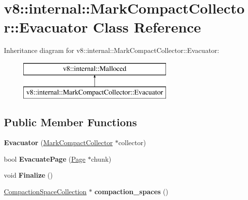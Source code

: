 \hypertarget{classv8_1_1internal_1_1_mark_compact_collector_1_1_evacuator}{}\section{v8\+:\+:internal\+:\+:Mark\+Compact\+Collector\+:\+:Evacuator Class Reference}
\label{classv8_1_1internal_1_1_mark_compact_collector_1_1_evacuator}
Inheritance diagram for v8\+:\+:internal\+:\+:Mark\+Compact\+Collector\+:\+:Evacuator\+:\begin{figure}[H]
\begin{center}
\leavevmode
\includegraphics[height=2.000000cm]{classv8_1_1internal_1_1_mark_compact_collector_1_1_evacuator}
\end{center}
\end{figure}
\subsection*{Public Member Functions}
\begin{DoxyCompactItemize}
\item 
{\bfseries Evacuator} (\hyperlink{classv8_1_1internal_1_1_mark_compact_collector}{Mark\+Compact\+Collector} $\ast$collector)\hypertarget{classv8_1_1internal_1_1_mark_compact_collector_1_1_evacuator_aa10dd913c673cfb9dc81e7feee451b35}{}\label{classv8_1_1internal_1_1_mark_compact_collector_1_1_evacuator_aa10dd913c673cfb9dc81e7feee451b35}

\item 
bool {\bfseries Evacuate\+Page} (\hyperlink{classv8_1_1internal_1_1_page}{Page} $\ast$chunk)\hypertarget{classv8_1_1internal_1_1_mark_compact_collector_1_1_evacuator_ad4230377f82124adf759e66c8faa88e7}{}\label{classv8_1_1internal_1_1_mark_compact_collector_1_1_evacuator_ad4230377f82124adf759e66c8faa88e7}

\item 
void {\bfseries Finalize} ()\hypertarget{classv8_1_1internal_1_1_mark_compact_collector_1_1_evacuator_a00135e355a27a506f67b150f9da229c2}{}\label{classv8_1_1internal_1_1_mark_compact_collector_1_1_evacuator_a00135e355a27a506f67b150f9da229c2}

\item 
\hyperlink{classv8_1_1internal_1_1_compaction_space_collection}{Compaction\+Space\+Collection} $\ast$ {\bfseries compaction\+\_\+spaces} ()\hypertarget{classv8_1_1internal_1_1_mark_compact_collector_1_1_evacuator_af33c4b5ccf30d1f455772b53eb0421fc}{}\label{classv8_1_1internal_1_1_mark_compact_collector_1_1_evacuator_af33c4b5ccf30d1f455772b53eb0421fc}

\end{DoxyCompactItemize}

